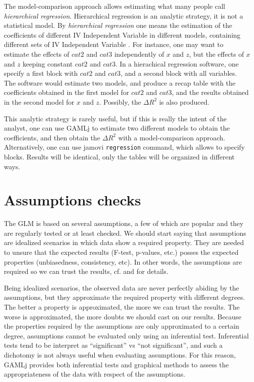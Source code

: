 \documentclass[
]{book}
\begin{document}
The model-comparison approach allows estimating what many people call \emph{hierarchical regression}. Hierarchical regression is an analytic strategy, it is not a statistical model. By \emph{hierarchical regression} one means the estimation of the coefficients of different {IV {Independent Variable} } in different models, containing different sets of {IV {Independent Variable} }. For instance, one may want to estimate the effects of \(cat2\) and \(cat3\) independently of \(x\) and \(z\), but the effects of \(x\) and \(z\) keeping constant \(cat2\) and \(cat3\). In a hierachical regression software, one specify a first block with \(cat2\) and \(cat3\), and a second block with all variables. The software would estimate two models, and produce a recap table with the coefficients obtained in the first model for \(cat2\) and \(cat3\), and the results obtained in the second model for \(x\) and \(z\). Possibly, the \(\Delta R^2\) is also produced.

This analytic strategy is rarely useful, but if this is really the intent of the analyst, one can use {GAMLj} to estimate two different models to obtain the coefficients, and then obtain the \(\Delta R^2\) with a model-comparison approach. Alternatively, one can use {jamovi} \texttt{regression} command, which allows to specify blocks. Results will be identical, only the tables will be organized in different ways.

\hypertarget{assumptions-checks}{%
\section{Assumptions checks}\label{assumptions-checks}}

The GLM is based on several assumptions, a few of which are popular and they are regularly tested or at least checked. We should start saying that assumptions are idealized scenarios in which data show a required property. They are needed to unsure that the expected results (F-test, p-values, etc.) posses the expected properties (unbiasedness, consistency, etc). In other words, the assumptions are required so we can trust the results, cf. \citet{nimon} and \citet{glass1972consequences} for details.

Being idealized scenarios, the observed data are never perfectly abiding by the assumptions, but they approximate the required property with different degrees. The better a property is approximated, the more we can trust the results. The worse is approximated, the more doubts we should cast on our results. Because the properties required by the assumptions are only approximated to a certain degree, assumptions cannot be evaluated only using an inferential test. Inferential tests tend to be interpret as ``significant'' vs ``not significant'', and such a dichotomy is not always useful when evaluating assumptions. For this reason, {GAMLj} provides both inferential tests and graphical methods to assess the appropriateness of the data with respect of the assumptions.
\end{document}
